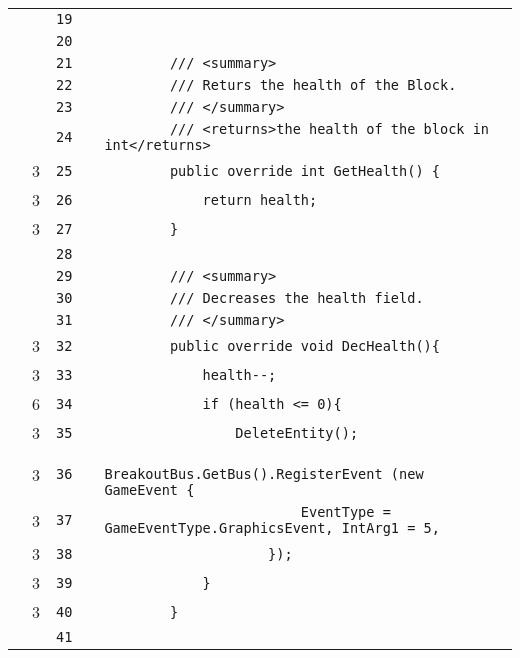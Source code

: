 \documentclass[a4paper,landscape,10pt]{article}
\begin{document}
\begin{longtable}[l]{lrrll}
\cellcolor{gray} &  & \verb~19~ & & \verb~~\\
\cellcolor{gray} &  & \verb~20~ & & \verb~~\\
\cellcolor{gray} &  & \verb~21~ & & \verb~        /// <summary>~\\
\cellcolor{gray} &  & \verb~22~ & & \verb~        /// Returs the health of the Block.~\\
\cellcolor{gray} &  & \verb~23~ & & \verb~        /// </summary>~\\
\cellcolor{gray} &  & \verb~24~ & & \verb~        /// <returns>the health of the block in int</returns>~\\
\cellcolor{green} & 3 & \verb~25~ & & \verb~        public override int GetHealth() {~\\
\cellcolor{green} & 3 & \verb~26~ & & \verb~            return health;~\\
\cellcolor{green} & 3 & \verb~27~ & & \verb~        }~\\
\cellcolor{gray} &  & \verb~28~ & & \verb~~\\
\cellcolor{gray} &  & \verb~29~ & & \verb~        /// <summary>~\\
\cellcolor{gray} &  & \verb~30~ & & \verb~        /// Decreases the health field.~\\
\cellcolor{gray} &  & \verb~31~ & & \verb~        /// </summary>~\\
\cellcolor{green} & 3 & \verb~32~ & & \verb~        public override void DecHealth(){~\\
\cellcolor{green} & 3 & \verb~33~ & & \verb~            health--;~\\
\cellcolor{green} & 6 & \verb~34~ & & \verb~            if (health <= 0){~\\
\cellcolor{green} & 3 & \verb~35~ & & \verb~                DeleteEntity();~\\
\cellcolor{green} & 3 & \verb~36~ & & \verb~                BreakoutBus.GetBus().RegisterEvent (new GameEvent {~\\
\cellcolor{green} & 3 & \verb~37~ & & \verb~                        EventType = GameEventType.GraphicsEvent, IntArg1 = 5,~\\
\cellcolor{green} & 3 & \verb~38~ & & \verb~                    });~\\
\cellcolor{green} & 3 & \verb~39~ & & \verb~            }~\\
\cellcolor{green} & 3 & \verb~40~ & & \verb~        }~\\
\cellcolor{gray} &  & \verb~41~ & & \verb~~\\

\end{longtable}
\end{document}
